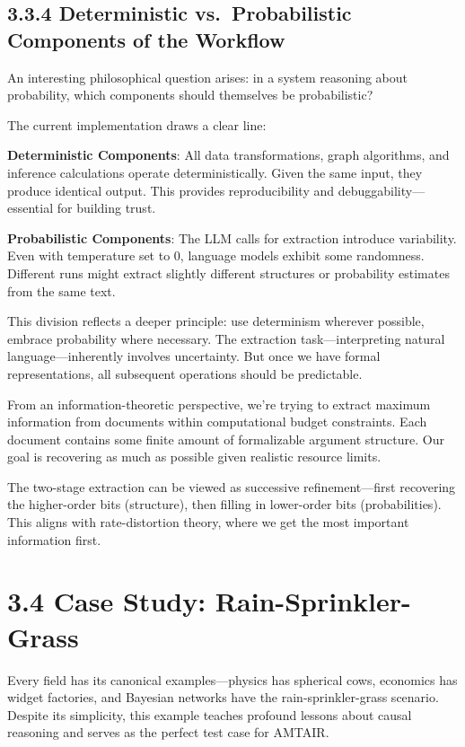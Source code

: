 \documentclass[
  11pt,
  letterpaper,
  openany]{book}
\begin{document}
\subsection{3.3.4 Deterministic vs.~Probabilistic Components of the
Workflow}\label{sec-deterministic-probabilistic}

An interesting philosophical question arises: in a system reasoning
about probability, which components should themselves be probabilistic?

The current implementation draws a clear line:

\textbf{Deterministic Components}: All data transformations, graph
algorithms, and inference calculations operate deterministically. Given
the same input, they produce identical output. This provides
reproducibility and debuggability---essential for building trust.

\textbf{Probabilistic Components}: The LLM calls for extraction
introduce variability. Even with temperature set to 0, language models
exhibit some randomness. Different runs might extract slightly different
structures or probability estimates from the same text.

This division reflects a deeper principle: use determinism wherever
possible, embrace probability where necessary. The extraction
task---interpreting natural language---inherently involves uncertainty.
But once we have formal representations, all subsequent operations
should be predictable.

From an information-theoretic perspective, we're trying to extract
maximum information from documents within computational budget
constraints. Each document contains some finite amount of formalizable
argument structure. Our goal is recovering as much as possible given
realistic resource limits.

The two-stage extraction can be viewed as successive refinement---first
recovering the higher-order bits (structure), then filling in
lower-order bits (probabilities). This aligns with rate-distortion
theory, where we get the most important information first.

\section{3.4 Case Study:
Rain-Sprinkler-Grass}\label{sec-case-rain-sprinkler}

Every field has its canonical examples---physics has spherical cows,
economics has widget factories, and Bayesian networks have the
rain-sprinkler-grass scenario. Despite its simplicity, this example
teaches profound lessons about causal reasoning and serves as the
perfect test case for AMTAIR.
\end{document}
